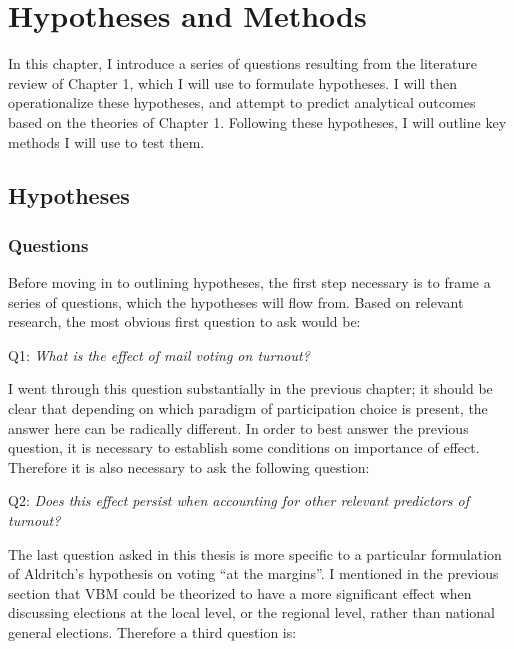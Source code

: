 \documentclass[12pt,twoside]{reedthesis}
\begin{document}
  \chapter{Hypotheses and Methods}\label{hypotheses-and-methods}
  
  In this chapter, I introduce a series of questions resulting from the
  literature review of Chapter 1, which I will use to formulate
  hypotheses. I will then operationalize these hypotheses, and attempt to
  predict analytical outcomes based on the theories of Chapter 1.
  Following these hypotheses, I will outline key methods I will use to
  test them.
  
  \section{Hypotheses}\label{hypotheses}
  
  \subsection{Questions}\label{questions}
  
  Before moving in to outlining hypotheses, the first step necessary is to
  frame a series of questions, which the hypotheses will flow from. Based
  on relevant research, the most obvious first question to ask would be:
  
  \begin{center}
  Q1: \textit{What is the effect of mail voting on turnout?}
  \end{center}
  
  I went through this question substantially in the previous chapter; it
  should be clear that depending on which paradigm of participation choice
  is present, the answer here can be radically different. In order to best
  answer the previous question, it is necessary to establish some
  conditions on importance of effect. Therefore it is also necessary to
  ask the following question:
  
  \begin{center}   
  Q2: \textit{Does this effect persist when accounting for other relevant predictors of turnout?}
  \end{center}
  
  The last question asked in this thesis is more specific to a particular
  formulation of Aldritch's hypothesis on voting ``at the margins''. I
  mentioned in the previous section that VBM could be theorized to have a
  more significant effect when discussing elections at the local level, or
  the regional level, rather than national general elections. Therefore a
  third question is:
  
\end{document}
